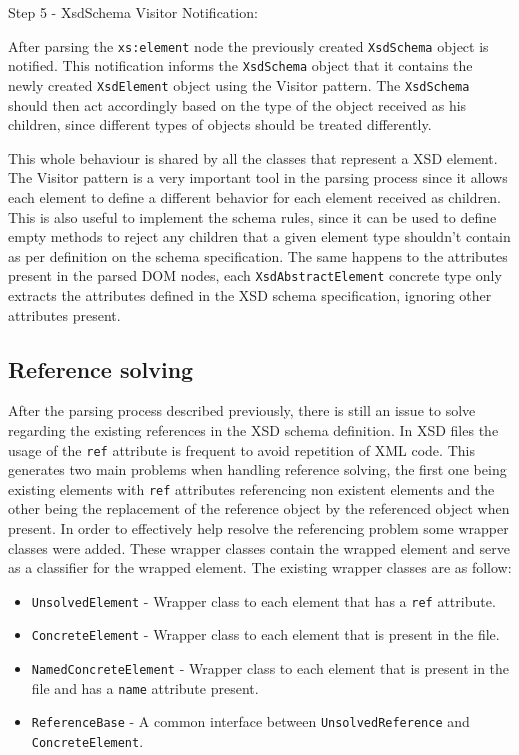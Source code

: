 Step 5 - XsdSchema Visitor Notification:

\noindent
After parsing the \texttt{xs:element} node the previously created \texttt{XsdSchema} object is notified. This notification informs the \texttt{XsdSchema} object that it contains the newly created \texttt{XsdElement} object using the Visitor pattern. The \texttt{XsdSchema} should then act accordingly based on the type of the object received as his children, since different types of objects should be treated differently. 

\noindent
This whole behaviour is shared by all the classes that represent a \ac{XSD} element. The Visitor pattern is a very important tool in the parsing process since it allows each element to define a different behavior for each element received as children. This is also useful to implement the schema rules, since it can be used to define empty methods to reject any children that a given element type shouldn't contain as per definition on the schema specification. The same happens to the attributes present in the parsed \ac{DOM} nodes, each \texttt{XsdAbstractElement} concrete type only extracts the attributes defined in the \ac{XSD} schema specification, ignoring other attributes present.

\subsection{Reference solving}
\label{sec:refsolving}

After the parsing process described previously, there is still an issue to solve regarding the existing references in the \ac{XSD} schema definition. In \ac{XSD} files the usage of the \texttt{ref} attribute is frequent to avoid repetition of \ac{XML} code. This generates two main problems when handling reference solving, the first one being existing elements with \texttt{ref} attributes referencing non existent elements and the other being the replacement of the reference object by the referenced object when present. In order to effectively help resolve the referencing problem some wrapper classes were added. These wrapper classes contain the wrapped element and serve as a classifier for the wrapped element. The existing wrapper classes are as follow:

\begin{itemize}  
	\item \texttt{UnsolvedElement} - Wrapper class to each element that has a \texttt{ref} attribute.
	\item \texttt{ConcreteElement} - Wrapper class to each element that is present in the file.
	\item \texttt{NamedConcreteElement} - Wrapper class to each element that is present in the file and has a \texttt{name} attribute present.
	\item \texttt{ReferenceBase} - A common interface between \texttt{UnsolvedReference} and \texttt{ConcreteElement}.
\end{itemize}

